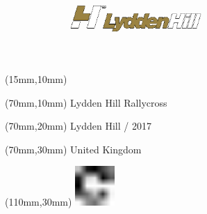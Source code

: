 \null\newpage
\begin{textblock*}{50mm}(15mm,10mm)%
\includegraphics[width=50mm]{LG/LYD.png}
\end{textblock*}
\begin{textblock*}{130mm}(70mm,10mm)%
{\fontsize{20}{20}\selectfont Lydden Hill Rallycross}\\
\end{textblock*}
\begin{textblock*}{120mm}(70mm,20mm)%
{\fontsize{16}{16}\selectfont Lydden Hill / 2017}\\
\end{textblock*}
\begin{textblock*}{120mm}(70mm,30mm)%
{\fontsize{12}{12}\selectfont United Kingdom}
\end{textblock*}
\begin{textblock*}{30mm}(110mm,30mm)%
\centering
\includegraphics[height=15mm]{icons/fa-rotate-right.pdf}
\end{textblock*}
